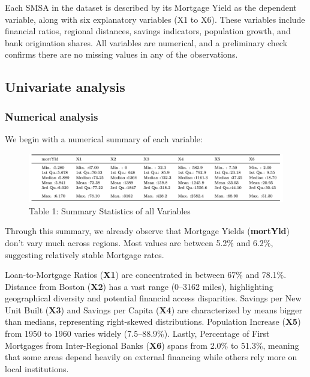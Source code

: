 \documentclass[
  12pt,
]{article}
\begin{document}
Each SMSA in the dataset is described by its Mortgage Yield as the
dependent variable, along with six explanatory variables (X1 to X6).
These variables include financial ratios, regional distances, savings
indicators, population growth, and bank origination shares. All
variables are numerical, and a preliminary check confirms there are no
missing values in any of the observations.

\subsection{Univariate analysis}\label{univariate-analysis}

\subsubsection{Numerical analysis}\label{numerical-analysis}

We begin with a numerical summary of each variable:

\vspace{-0.5cm}
\begin{figure}[H]
\centering
\includegraphics[width=1.0\textwidth]{figures/Table 1.png}
\captionsetup{font=normalsize}
\caption*{Table 1: Summary Statistics of all Variables}
\end{figure}
\vspace{-0.5cm}

Through this summary, we already observe that Mortgage Yields
(\textbf{mortYld}) don't vary much across regions. Most values are
between 5.2\% and 6.2\%, suggesting relatively stable Mortgage rates.

Loan-to-Mortgage Ratios (\textbf{X1}) are concentrated in between 67\%
and 78.1\%. Distance from Boston (\textbf{X2}) has a vast range (0--3162
miles), highlighting geographical diversity and potential financial
access disparities. Savings per New Unit Built (\textbf{X3}) and Savings
per Capita (\textbf{X4}) are characterized by means bigger than medians,
representing right-skewed distributions. Population Increase
(\textbf{X5}) from 1950 to 1960 varies widely (7.5--88.9\%). Lastly,
Percentage of First Mortgages from Inter-Regional Banks (\textbf{X6})
spans from 2.0\% to 51.3\%, meaning that some areas depend heavily on
external financing while others rely more on local institutions.
\end{document}
